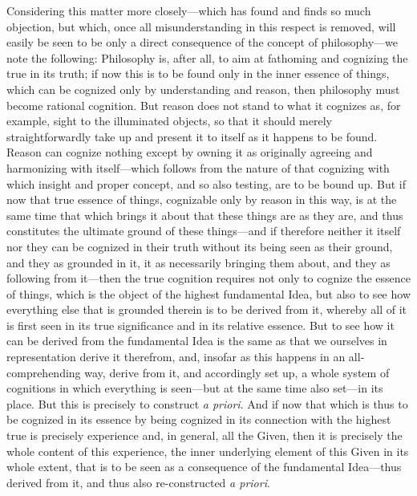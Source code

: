 \documentclass[12pt,a4paper]{book}
\begin{document}
{\small Considering this matter more closely---which has found and finds so much
objection, but which, once all misunderstanding in this respect is removed, will
easily be seen to be only a direct consequence of the concept of philosophy---we note
the following: Philosophy is, after all, to aim at fathoming and cognizing the true
in its truth; if now this is to be found only in the inner essence of things, which
can be cognized only by understanding and reason, then philosophy must become
rational cognition. But reason does not stand to what it cognizes as, for example,
sight to the illuminated objects, so that it should merely straightforwardly take up
and present it to itself as it happens to be found. Reason can cognize nothing except
by owning it as originally agreeing and harmonizing with itself---which follows from
the nature of that cognizing with which insight and proper concept, and so also
testing, are to be bound up. But if now that true essence of things, cognizable only
by reason in this way, is at the same time that which brings it about that these
things are as they are, and thus constitutes the ultimate ground of these
things---and if therefore neither it itself nor they can be cognized in their truth
without its being seen as their ground, and they as grounded in it, it as necessarily
bringing them about, and they as following from it---then the true cognition requires
not only to cognize the essence of things, which is the object of the highest
fundamental Idea, but also to see how everything else that is grounded therein is to
be derived from it, whereby all of it is first seen in its true significance and in
its relative essence. But to see how it can be derived from the fundamental Idea is
the same as that we ourselves in representation derive it therefrom, and, insofar as
this happens in an all-comprehending way, derive from it, and accordingly set up, a
whole system of cognitions in which everything is seen---but at the same time also
set---in its place. But this is precisely to construct \textit{a priori}. And if now
that which is thus to be cognized in its essence by being cognized in its connection
with the highest true is precisely experience and, in general, all the Given, then it
is precisely the whole content of this experience, the inner underlying element of
this Given in its whole extent, that is to be seen as a consequence of the
fundamental Idea---thus derived from it, and thus also re-constructed \textit{a
priori}.\par}
\end{document}
